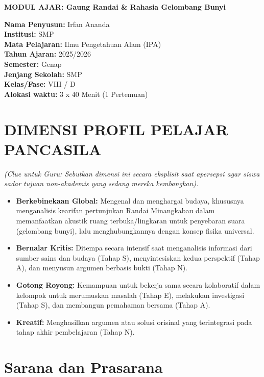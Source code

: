 \documentclass[12pt,a4paper]{article}
\begin{document}
\begin{center}
\textbf{\Large MODUL AJAR: Gaung Randai \& Rahasia Gelombang Bunyi}
\end{center}

\vspace{0.5cm}

\begin{tcolorbox}[mystyle]
\textbf{Nama Penyusun:} Irfan Ananda \\
\textbf{Institusi:} SMP \\
\textbf{Mata Pelajaran:} Ilmu Pengetahuan Alam (IPA) \\
\textbf{Tahun Ajaran:} 2025/2026 \\
\textbf{Semester:} Genap \\
\textbf{Jenjang Sekolah:} SMP \\
\textbf{Kelas/Fase:} VIII / D \\
\textbf{Alokasi waktu:} 3 x 40 Menit (1 Pertemuan)
\end{tcolorbox}

\section{DIMENSI PROFIL PELAJAR PANCASILA}
\textit{(Clue untuk Guru: Sebutkan dimensi ini secara eksplisit saat apersepsi agar siswa sadar tujuan non-akademis yang sedang mereka kembangkan).}

\begin{itemize}
\item \textbf{Berkebinekaan Global:} Mengenal dan menghargai budaya, khususnya menganalisis kearifan pertunjukan Randai Minangkabau dalam memanfaatkan akustik ruang terbuka/lingkaran untuk penyebaran suara (gelombang bunyi), lalu menghubungkannya dengan konsep fisika universal.
\item \textbf{Bernalar Kritis:} Ditempa secara intensif saat menganalisis informasi dari sumber sains dan budaya (Tahap S), menyintesiskan kedua perspektif (Tahap A), dan menyusun argumen berbasis bukti (Tahap N).
\item \textbf{Gotong Royong:} Kemampuan untuk bekerja sama secara kolaboratif dalam kelompok untuk merumuskan masalah (Tahap E), melakukan investigasi (Tahap S), dan membangun pemahaman bersama (Tahap A).
\item \textbf{Kreatif:} Menghasilkan argumen atau solusi orisinal yang terintegrasi pada tahap akhir pembelajaran (Tahap N).
\end{itemize}

\section{Sarana dan Prasarana}
\end{document}
